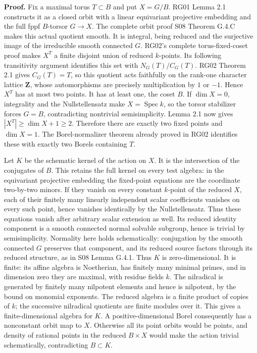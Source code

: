 \documentclass[11pt,a4paper,openany]{report}
\begin{document}
\textbf{Proof.} Fix a maximal torus \(T\subset B\) and put \(X=G/B\). RG01 Lemma 2.1 constructs it as a closed orbit with a linear equivariant projective embedding and the full fppf \(B\)-torsor \(G\to X\). The complete orbit proof S08 Theorem G.4.C makes this actual quotient smooth. It is integral, being reduced and the surjective image of the irreducible smooth connected \(G\). RG02's complete torus-fixed-coset proof makes \(X^T\) a finite disjoint union of reduced \(k\)-points. Its following transitivity argument identifies this set with \(N_G(T)/C_G(T)\). RG02 Theorem 2.1 gives \(C_G(T)=T\), so this quotient acts faithfully on the rank-one character lattice \(\mathbf Z\), whose automorphisms are precisely multiplication by \(1\) or \(-1\). Hence \(X^T\) has at most two points. It has at least one, the coset \(B\). If \(\dim X=0\), integrality and the Nullstellensatz make \(X=\operatorname{Spec}k\), so the torsor stabilizer forces \(G=B\), contradicting nontrivial semisimplicity. Lemma 2.1 now gives \(|X^T|\ge\dim X+1\ge2\). Therefore there are exactly two fixed points and \(\dim X=1\). The Borel-normalizer theorem already proved in RG02 identifies these with exactly two Borels containing \(T\).

Let \(K\) be the schematic kernel of the action on \(X\). It is the intersection of the conjugates of \(B\). This retains the full kernel on every test algebra: in the equivariant projective embedding the fixed-point equations are the coordinate two-by-two minors. If they vanish on every constant \(k\)-point of the reduced \(X\), each of their finitely many linearly independent scalar coefficients vanishes on every such point, hence vanishes identically by the Nullstellensatz. Thus these equations vanish after arbitrary scalar extension as well. Its reduced identity component is a smooth connected normal solvable subgroup, hence is trivial by semisimplicity. Normality here holds schematically: conjugation by the smooth connected \(G\) preserves that component, and its reduced source factors through its reduced structure, as in S08 Lemma G.4.1. Thus \(K\) is zero-dimensional. It is finite: its affine algebra is Noetherian, has finitely many minimal primes, and in dimension zero they are maximal, with residue fields \(k\). The nilradical is generated by finitely many nilpotent elements and hence is nilpotent, by the bound on monomial exponents. The reduced algebra is a finite product of copies of \(k\); the successive nilradical quotients are finite modules over it. This gives a finite-dimensional algebra for \(K\). A positive-dimensional Borel consequently has a nonconstant orbit map to \(X\). Otherwise all its point orbits would be points, and density of rational points in the reduced \(B\times X\) would make the action trivial schematically, contradicting \(B\subset K\).
\end{document}
